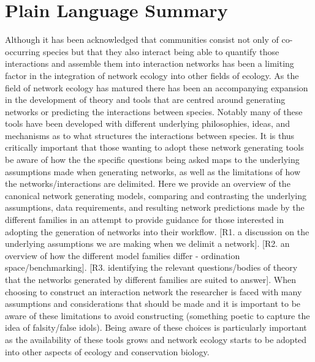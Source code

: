 \documentclass[
]{agujournal2019}
\begin{document}
\section*{Plain Language Summary}
Although it has been acknowledged that communities consist not only of
co-occurring species but that they also interact being able to quantify
those interactions and assemble them into interaction networks has been
a limiting factor in the integration of network ecology into other
fields of ecology. As the field of network ecology has matured there has
been an accompanying expansion in the development of theory and tools
that are centred around generating networks or predicting the
interactions between species. Notably many of these tools have been
developed with different underlying philosophies, ideas, and mechanisms
as to what structures the interactions between species. It is thus
critically important that those wanting to adopt these network
generating tools be aware of how the the specific questions being asked
maps to the underlying assumptions made when generating networks, as
well as the limitations of how the networks/interactions are delimited.
Here we provide an overview of the canonical network generating models,
comparing and contrasting the underlying assumptions, data requirements,
and resulting network predictions made by the different families in an
attempt to provide guidance for those interested in adopting the
generation of networks into their workflow. {[}R1. a discussion on the
underlying assumptions we are making when we delimit a network{]}.
{[}R2. an overview of how the different model families differ -
ordination space/benchmarking{]}. {[}R3. identifying the relevant
questions/bodies of theory that the networks generated by different
families are suited to answer{]}. When choosing to construct an
interaction network the researcher is faced with many assumptions and
considerations that should be made and it is important to be aware of
these limitations to avoid constructing (something poetic to capture the
idea of falsity/false idols). Being aware of these choices is
particularly important as the availability of these tools grows and
network ecology starts to be adopted into other aspects of ecology and
conservation biology.
\end{document}
